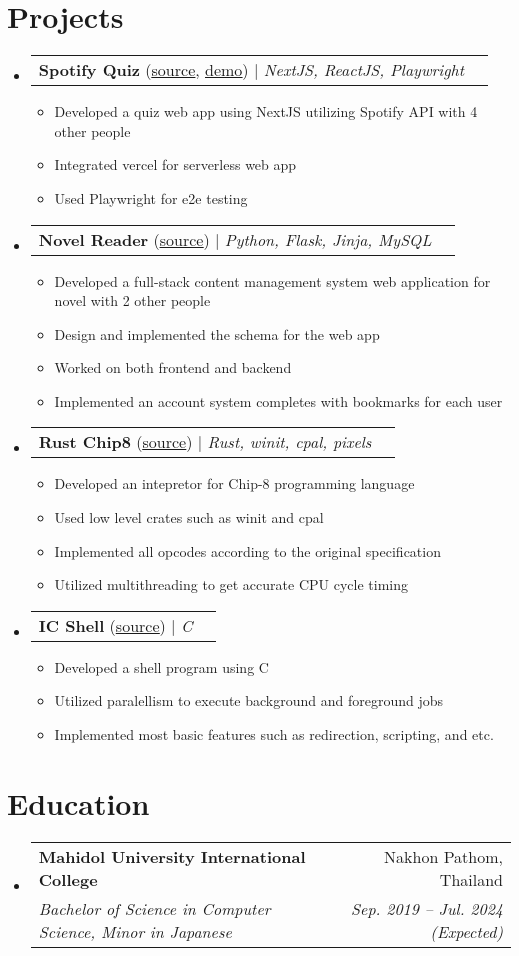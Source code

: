 \documentclass[letterpaper,11pt]{article}
\makeatletter
\newcommand{\resumeItem}[1]{
  \item\small{
    {#1 \vspace{-2pt}}
  }
}
\newcommand{\resumeSubheading}[4]{
  \vspace{-2pt}\item
    \begin{tabular*}{0.97\textwidth}[t]{l@{\extracolsep{\fill}}r}
      \textbf{#1} & #2 \\
      \textit{\small#3} & \textit{\small #4} \\
    \end{tabular*}\vspace{-7pt}
}
\newcommand{\resumeProjectHeading}[2]{
    \item
    \begin{tabular*}{0.97\textwidth}{l@{\extracolsep{\fill}}r}
      \small#1 & #2 \\
    \end{tabular*}\vspace{-7pt}
}
\newcommand{\resumeSubHeadingListStart}{\begin{itemize}[leftmargin=0.15in, label={}]}
\newcommand{\resumeSubHeadingListEnd}{\end{itemize}}
\newcommand{\resumeItemListStart}{\begin{itemize}}
\newcommand{\resumeItemListEnd}{\end{itemize}\vspace{-5pt}}
\makeatother
\begin{document}
\section{Projects}
    \resumeSubHeadingListStart
      \resumeProjectHeading
        {\textbf{Spotify Quiz} (\href{https://github.com/spotify-quiz/spotify-quiz}{\underline{source}}, \href{https://spotify-quiz-silk.vercel.app/}{\underline{demo}}) $|$ \emph{NextJS, ReactJS, Playwright}}{}
        \resumeItemListStart
          \resumeItem{Developed a quiz web app using NextJS utilizing Spotify API with 4 other people}
          \resumeItem{Integrated vercel for serverless web app}
          \resumeItem{Used Playwright for e2e testing}
        \resumeItemListEnd
      \resumeProjectHeading
        {\textbf{Novel Reader} (\href{https://github.com/fordkuppp/novel-reader}{\underline{source}}) $|$ \emph{Python, Flask, Jinja, MySQL}}{}
        \resumeItemListStart
          \resumeItem{Developed a full-stack content management system web application for novel with 2 other people}
          \resumeItem{Design and implemented the schema for the web app}
          \resumeItem{Worked on both frontend and backend}
          \resumeItem{Implemented an account system completes with bookmarks for each user}
        \resumeItemListEnd
      \resumeProjectHeading
          {\textbf{Rust Chip8} (\href{https://github.com/fordkuppp/rust-chip8}{\underline{source}}) $|$ \emph{Rust, winit, cpal, pixels}}{}
          \resumeItemListStart
            \resumeItem{Developed an intepretor for Chip-8 programming language}
            \resumeItem{Used low level crates such as winit and cpal}
            \resumeItem{Implemented all opcodes according to the original specification}
            \resumeItem{Utilized multithreading to get accurate CPU cycle timing}
          \resumeItemListEnd
      \resumeProjectHeading
          {\textbf{IC Shell} (\href{https://github.com/fordkuppp/icsh}{\underline{source}}) $|$ \emph{C}}{}
          \resumeItemListStart
            \resumeItem{Developed a shell program using C }
            \resumeItem{Utilized paralellism to execute background and foreground jobs }
            \resumeItem{Implemented most basic features such as redirection, scripting, and etc. }
          \resumeItemListEnd
    \resumeSubHeadingListEnd

\section{Education}
  \resumeSubHeadingListStart
    \resumeSubheading
      {Mahidol University International College}{Nakhon Pathom, Thailand}
      {Bachelor of Science in Computer Science, Minor in Japanese}{Sep. 2019 -- Jul. 2024 (Expected)}
  \resumeSubHeadingListEnd
\end{document}
